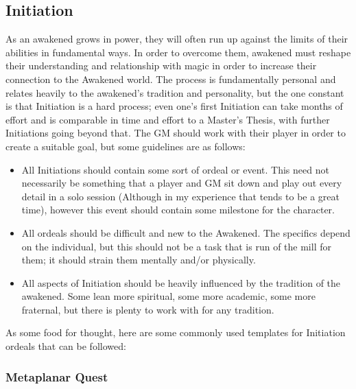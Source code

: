 \begin{multicols*}{3}
	\subsection{Initiation}
	
	As an awakened grows in power, they will often run up against the limits of their abilities in fundamental ways. In order to overcome them, awakened must reshape their understanding and relationship with magic in order to increase their connection to the Awakened world. The process is fundamentally personal and relates heavily to the awakened's tradition and personality, but the one constant is that Initiation is a hard process; even one's first Initiation can take months of effort and is comparable in time and effort to a Master's Thesis, with further Initiations going beyond that. The GM should work with their player in order to create a suitable goal, but some guidelines are as follows:
	
	\begin{itemize}
		\itemsep 0pt
		\item All Initiations should contain some sort of ordeal or event. This need not necessarily be something that a player and GM sit down and play out every detail in a solo session (Although in my experience that tends to be a great time), however this event should contain some milestone for the character.
		\item All ordeals should be difficult and new to the Awakened. The specifics depend on the individual, but this should not be a task that is run of the mill for them; it should strain them mentally and/or physically.
		\item All aspects of Initiation should be heavily influenced by the tradition of the awakened. Some lean more spiritual, some more academic, some more fraternal, but there is plenty to work with for any tradition.
	\end{itemize}

	As some food for thought, here are some commonly used templates for Initiation ordeals that can be followed:
	
	\subsubsection*{Metaplanar Quest}
	

\end{multicols*}
